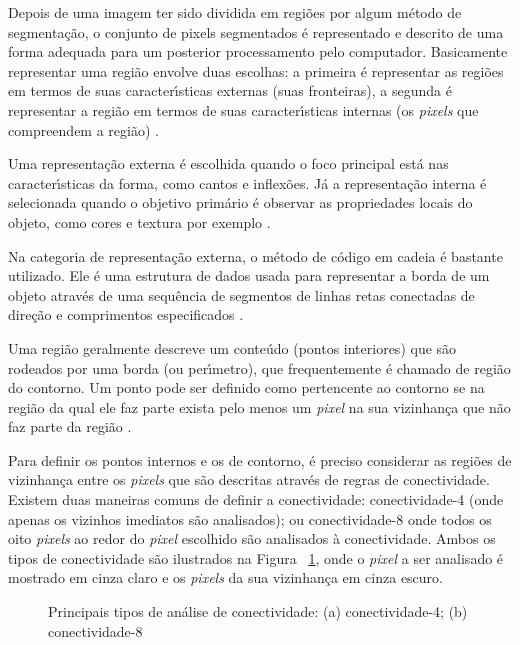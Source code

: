 Depois de uma imagem ter sido dividida em regi\~{o}es por algum m\'{e}todo de segmenta\c{c}\~{a}o, o conjunto de pixels segmentados \'{e} representado e descrito de uma forma adequada para um posterior processamento pelo computador. Basicamente representar uma regi\~{a}o envolve duas escolhas: a primeira \'{e} representar as regi\~{o}es em termos de suas caracter\'{\i}sticas externas (suas fronteiras), a segunda \'{e} representar a regi\~{a}o em termos de suas caracter\'{\i}sticas internas (os \emph{pixels} que compreendem a regi\~{a}o) \cite{GONZALEZ:2008}.

Uma representa\c{c}\~{a}o externa \'{e} escolhida quando o foco principal est\'{a} nas caracter\'{\i}sticas da forma, como cantos e inflex\~{o}es. J\'{a} a representa\c{c}\~{a}o interna \'{e} selecionada quando o objetivo prim\'{a}rio \'{e} observar as propriedades locais do objeto, como cores e textura por exemplo \cite{MOESLUND:2001}.

Na categoria de representa\c{c}\~{a}o externa, o m\'{e}todo de c\'{o}digo em cadeia \'{e} bastante utilizado. Ele \'{e} uma estrutura de dados usada para representar a borda de um objeto atrav\'{e}s de uma sequ\^{e}ncia de segmentos de linhas retas conectadas de dire\c{c}\~{a}o e comprimentos especificados \cite{JAHNE:2005}\cite{GONZALEZ:2008}.

Uma regi\~{a}o geralmente descreve um conte\'{u}do (pontos interiores) que s\~{a}o rodeados por uma borda (ou per\'{\i}metro), que frequentemente \'{e} chamado de regi\~{a}o do contorno. Um ponto pode ser definido como pertencente ao contorno se na regi\~{a}o da qual ele faz parte exista pelo menos um \emph{pixel} na sua vizinhan\c{c}a que n\~{a}o faz parte da regi\~{a}o \cite{NIXON:2002}.

Para definir os pontos internos e os de contorno, \'{e} preciso considerar as regi\~{o}es de vizinhan\c{c}a entre os \emph{pixels} que s\~{a}o descritas atrav\'{e}s de regras de conectividade. Existem duas maneiras comuns de definir a conectividade: conectividade-4 (onde apenas os vizinhos imediatos s\~{a}o analisados); ou conectividade-8 onde todos os oito \emph{pixels} ao redor do \emph{pixel} escolhido s\~{a}o analisados \`{a} conectividade. Ambos os tipos de conectividade s\~{a}o ilustrados na Figura ~\ref{FIG:CONECT}, onde o \emph{pixel} a ser analisado \'{e} mostrado em cinza claro e os \emph{pixels} da sua vizinhan\c{c}a em cinza escuro.

\begin{figure}[h]
\centering
{}
\caption[Principais tipos de an\'{a}lise de conectividade]{Principais tipos de an\'{a}lise de conectividade: (a) conectividade-4; (b) conectividade-8} \label{FIG:CONECT}
\end{figure}


